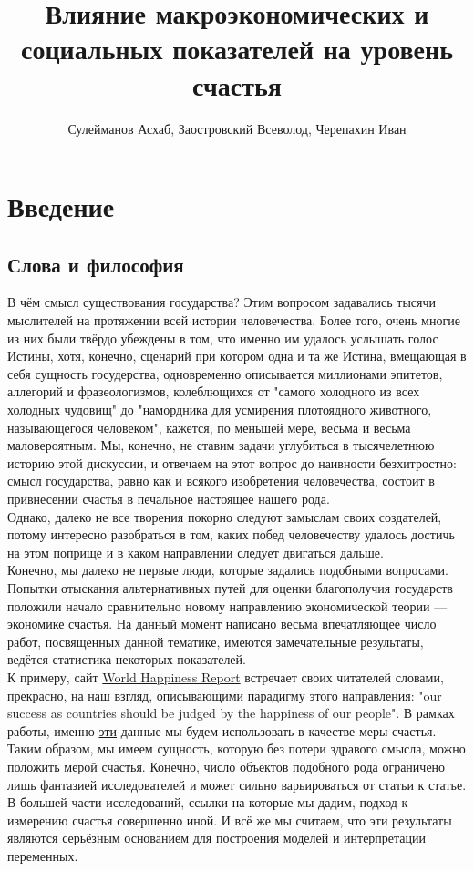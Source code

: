 \documentclass[russian]{vegareport}
\title{Влияние макроэкономических и социальных показателей на уровень счастья}
\author{Сулейманов Асхаб, Заостровский Всеволод, Черепахин Иван}
\date{}
\begin{document}
    \maketitle

    \chapter{Введение}
        \section{Слова и философия}
        В чём смысл существования государства? Этим вопросом задавались тысячи мыслителей на протяжении всей истории человечества. Более того, очень многие из них были твёрдо убеждены в том, что именно им удалось услышать голос Истины, хотя, конечно, сценарий при котором одна и та же Истина, вмещающая в себя сущность госудерства, одновременно описывается миллионами эпитетов, аллегорий и фразеологизмов, колеблющихся от "самого холодного из всех холодных чудовищ" до "намордника для усмирения плотоядного животного, называющегося человеком",  кажется, по меньшей мере, весьма и весьма маловероятным. Мы, конечно, не ставим задачи углубиться в тысячелетнюю историю этой дискуссии, и отвечаем на этот вопрос до наивности безхитростно: смысл государства, равно как и всякого изобретения человечества, состоит в привнесении счастья в печальное настоящее нашего рода. 
        \\
        Однако, далеко не все творения покорно следуют замыслам своих создателей, потому интересно разобраться в том, каких побед человечеству удалось достичь на этом поприще и в каком направлении следует двигаться дальше. 
        \\
        Конечно, мы далеко не первые люди, которые задались подобными вопросами. Попытки отыскания альтернативных путей для оценки благополучия государств положили начало сравнительно новому направлению экономической теории --- экономике счастья. На данный момент написано весьма впечатляющее число работ, посвященных данной тематике, имеются замечательные результаты, ведётся статистика некоторых показателей.    
        \\
        К примеру, сайт \href{https://worldhappiness.report/}{World Happiness Report}
        встречает своих читателей словами, прекрасно, на наш взгляд, описывающими парадигму этого направления: "our success as countries should be judged by the happiness of our people". В рамках работы, именно \href{https://www.kaggle.com/datasets/mathurinache/world-happiness-report-20152021?select=2016.csv}{эти} данные мы будем использовать в качестве меры счастья. Таким образом, мы имеем сущность, которую без потери здравого смысла, можно положить мерой счастья. Конечно, число объектов подобного рода ограничено лишь фантазией исследователей и может сильно варьироваться от статьи к статье. В большей части исследований, ссылки на которые мы дадим, подход к измерению счастья совершенно иной. И всё же мы считаем, что эти результаты являются серьёзным основанием для построения моделей и интерпретации переменных. 
\end{document}
